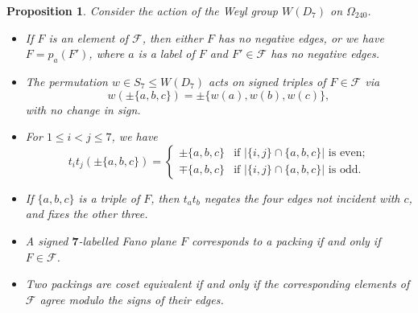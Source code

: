 \documentclass{amsart}
\theoremstyle{plain}
\newtheorem{prop}[theorem]{Proposition}
\theoremstyle{definition}
\theoremstyle{remark}
\numberwithin{equation}{section}
\newcommand{\calf}{\mathcal{F}}
\newcommand{\seven}{{\mathbf 7}}
\newcommand{\qpx}{\Omega_{240}}
\begin{document}
\begin{prop}\label{prop:7label}
Consider the action of the Weyl group $W(D_7)$ on $\qpx$.
\begin{itemize}
\item[{\rm (i)}]{If $F$ is an element of $\calf$, then either $F$ has no negative edges, or we have $F = p_a(F')$,
where $a$ is a label of $F$ and $F' \in \calf$ has no negative edges.}
\item[{\rm (ii)}]{The permutation $w \in S_7 \leq W(D_7)$ acts on signed triples of $F \in \calf$ via $$
w(\pm \{a, b, c\}) = \pm \{ w(a), w(b), w(c) \}
,$$ with no change in sign.}
\item[{\rm (iii)}]{For $1 \leq i < j \leq 7$, we have $$
t_i t_j (\pm \{a, b, c\}) = \begin{cases}
\pm \{a, b, c\} & \text{if $|\{i, j\} \cap \{a, b, c\}|$ is even;}\\
\mp \{a, b, c\} & \text{if $|\{i, j\} \cap \{a, b, c\}|$ is odd.}
\end{cases}
$$}
\item[{\rm (iv)}]{If $\{a, b, c\}$ is a triple of $F$, then $t_a t_b$ negates the four edges not incident with $c$,
and fixes the other three.}
\item[{\rm (v)}]{A signed $\seven$-labelled Fano plane $F$ corresponds to a packing if and only if $F \in \calf$.}
\item[{\rm (vi)}]{Two packings are coset equivalent if and only if the corresponding elements of $\calf$ agree
modulo the signs of their edges.}
\end{itemize}
\end{prop}
\end{document}
